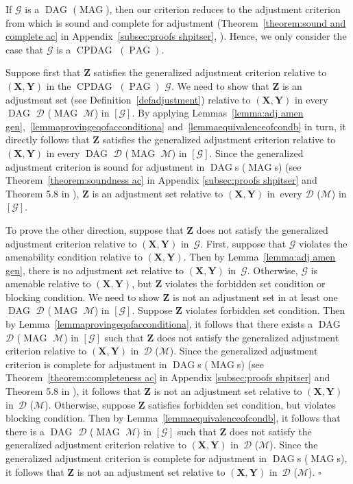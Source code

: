 \documentclass[11pt,a4paper]{article}
\newenvironment{proofof}[1][]{\begin{trivlist}
   \item[\hskip \labelsep {\bfseries Proof of #1.}]}{\hfill{}$\square$\end{trivlist}}
\DeclareMathOperator{\CPDAG}{CPDAG}
\DeclareMathOperator{\DAG}{DAG}
\DeclareMathOperator{\MAG}{MAG}
\DeclareMathOperator{\PAG}{PAG}
\newcommand{\amen}{the amenability condition\xspace}
\newcommand{\forb}{the forbidden set condition\xspace}
\newcommand{\blck}{the blocking condition\xspace}
\newcommand{\g}[1][G]{\mathcal{#1}}
\begin{document}
\begin{proofof}[Theorem~\ref{theorem:gac}]
 If $\g$ is a $\DAG$ ($\MAG$), then our criterion reduces to the adjustment criterion from \cite{shpitser2012avalidity} \citep{vanconstructing} which is sound and complete for adjustment (Theorem~\ref{theorem:sound and complete ac} in Appendix~\ref{subsec:proofs shpitser}, \citealp[Theorem~5.8 in][]{vanconstructing}). Hence, we only consider the case that $\g$ is a $\CPDAG$ $(\PAG)$.

   Suppose first that $\mathbf{Z}$ satisfies the generalized adjustment criterion relative to $(\mathbf{X,Y})$ in the $\CPDAG$ $(\PAG)$ $\g$. We need to show that $\mathbf{Z}$ is an adjustment set (see Definition~\ref{defadjustment}) relative to $(\mathbf{X,Y})$ in every $\DAG$ $\g[D]$ ($\MAG$ $\g[M]$) in $[\g]$. By applying Lemmas~\ref{lemma:adj amen gen},~\ref{lemmaprovingeqofacconditiona} and~\ref{lemmaequivalenceofcondb} in turn, it directly follows that $\mathbf{Z}$ satisfies the generalized adjustment criterion relative to $(\mathbf{X,Y})$ in every $\DAG$ $\g[D]$ ($\MAG$ $\g[M]$) in $[\g]$.
  Since the generalized adjustment criterion is sound for adjustment in $\DAG$s ($\MAG$s) 
  (see Theorem~\ref{theorem:soundness ac} in Appendix \ref{subsec:proofs shpitser} and Theorem 5.8 in \citealp{vanconstructing}), $\mathbf{Z}$ is an adjustment set relative to $(\mathbf{X,Y})$ in~every $\g[D]$ ($\g[M]$) in $[\g]$.

   To prove the other direction, suppose that $\mathbf{Z}$ does not satisfy the generalized adjustment criterion relative to $(\mathbf{X,Y})$ in~$\g$. First, suppose that $\g$ violates \amen{} relative to $(\mathbf{X},\mathbf{Y})$. Then by Lemma~\ref{lemma:adj amen gen}, there is no adjustment set relative to $(\mathbf{X},\mathbf{Y})$ in~$\g$.
   Otherwise, $\g$ is amenable relative to $(\mathbf{X,Y})$, but $\mathbf{Z}$ violates \forb or \expandafter\ignorespaces\blck.
   We need to show $\mathbf{Z}$ is not an adjustment set in at least one $\DAG$ $\g[D]$ ($\MAG$ $\g[M]$) in $[\g]$.
   Suppose $\mathbf{Z}$ violates \expandafter\ignorespaces\forb. Then by Lemma~\ref{lemmaprovingeqofacconditiona}, it follows that there exists a $\DAG$ $\g[D]$ ($\MAG$ $\g[M]$) in $[\g]$ such that $\mathbf{Z}$ does not satisfy the generalized adjustment criterion relative to $(\mathbf{X,Y})$ in~$\g[D]$ ($\g[M]$). Since the generalized adjustment criterion is complete for adjustment in $\DAG$s ($\MAG$s)
   (see Theorem~\ref{theorem:completeness ac} in Appendix \ref{subsec:proofs shpitser} and Theorem 5.8 in \citealp{vanconstructing}), it follows that $\mathbf{Z}$ is not an adjustment set relative to $(\mathbf{X,Y})$ in~$\g[D]$ ($\g[M]$).
   Otherwise, suppose $\mathbf{Z}$ satisfies \expandafter\ignorespaces\forb, but violates \expandafter\ignorespaces\blck. Then by Lemma~\ref{lemmaequivalenceofcondb}, it follows that there is a $\DAG$ $\g[D]$ ($\MAG$ $\g[M]$) in $[\g]$ such that $\mathbf{Z}$ does not satisfy the generalized adjustment criterion relative to $(\mathbf{X,Y})$ in~$\g[D]$ ($\g[M]$). Since the generalized adjustment criterion is complete for adjustment in $\DAG$s ($\MAG$s), it follows that $\mathbf{Z}$ is not an adjustment set relative to $(\mathbf{X,Y})$ in~$\g[D]$ ($\g[M]$).
\end{proofof}
\end{document}
